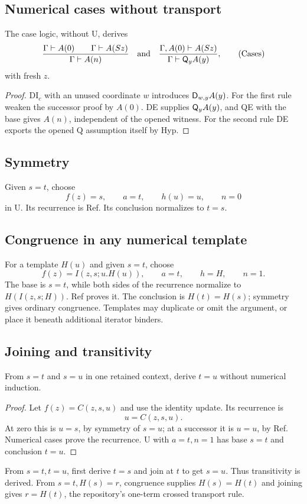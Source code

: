 \subsection{Numerical cases without transport}
\begin{lemma}
The case logic, without U, derives
\[
 \frac{\Gamma\vdash A(0)\qquad\Gamma\vdash A(Sz)}
      {\Gamma\vdash A(n)}
 \quad\text{and}\quad
 \frac{\Gamma,A(0)\vdash A(Sz)}
      {\Gamma\vdash\mathsf Q_yA(y)},                          \tag{Cases}\label{eq:cases}
\]
with fresh $z$.
\end{lemma}
\begin{proof}
DI$_c$ with an unused coordinate $w$ introduces $\mathsf D_{w,y}A(y)$.
For the first rule weaken the successor proof by $A(0)$.
DE supplies $\mathsf Q_yA(y)$, and QE with the base gives $A(n)$,
independent of the opened witness. For the second rule DE exports the
opened Q assumption itself by Hyp.
\end{proof}

\subsection{Symmetry}
Given $s=t$, choose
\[
 f(z)=s,\qquad a=t,\qquad h(u)=u,\qquad n=0
\]
in U. Its recurrence is Ref. Its conclusion normalizes to $t=s$.

\subsection{Congruence in any numerical template}
For a template $H(u)$ and given $s=t$, choose
\[
 f(z)=I(z,s;u.H(u)),\qquad a=t,\qquad h=H,\qquad n=1.
\]
The base is $s=t$, while both sides of the recurrence normalize to
$H(I(z,s;H))$. Ref proves it. The conclusion is $H(t)=H(s)$;
symmetry gives ordinary congruence. Templates may duplicate or omit
the argument, or place it beneath additional iterator binders.

\subsection{Joining and transitivity}
\begin{lemma}
From $s=t$ and $s=u$ in one retained context, derive $t=u$ without
numerical induction.
\end{lemma}
\begin{proof}
Let $f(z)=C(z,s,u)$ and use the identity update. Its recurrence is
\[
 u=C(z,s,u).
\]
At zero this is $u=s$, by symmetry of $s=u$; at a successor it is
$u=u$, by Ref. Numerical cases prove the recurrence.
U with $a=t,n=1$ has base $s=t$ and conclusion $t=u$.
\end{proof}
From $s=t,t=u$, first derive $t=s$ and join at $t$ to get $s=u$.
Thus transitivity is derived. From $s=t,H(s)=r$, congruence supplies
$H(s)=H(t)$ and joining gives $r=H(t)$, the repository's one-term
crossed transport rule.

